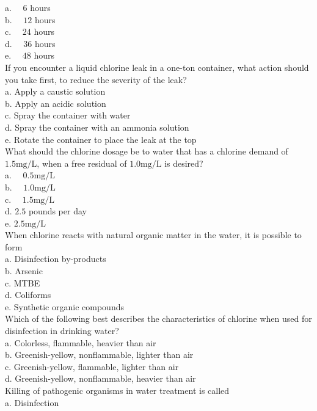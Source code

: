 a. $\quad 6$ hours\\
b. $\quad 12$ hours\\
c. $\quad 24$ hours\\
d. $\quad 36$ hours\\
e. $\quad 48$ hours\\
  If you encounter a liquid chlorine leak in a one-ton container, what action should you take first, to reduce the severity of the leak?\\
a. Apply a caustic solution\\
b. Apply an acidic solution\\
c. Spray the container with water\\
d. Spray the container with an ammonia solution\\
e. Rotate the container to place the leak at the top\\
  What should the chlorine dosage be to water that has a chlorine demand of $1.5 \mathrm{mg} / \mathrm{L}$, when a free residual of $1.0 \mathrm{mg} / \mathrm{L}$ is desired?\\
a. $\quad 0.5 \mathrm{mg} / \mathrm{L}$\\
b. $\quad 1.0 \mathrm{mg} / \mathrm{L}$\\
c. $\quad 1.5 \mathrm{mg} / \mathrm{L}$\\
d. $2.5$ pounds per day\\
e. $2.5 \mathrm{mg} / \mathrm{L}$\\
  When chlorine reacts with natural organic matter in the water, it is possible to form\\
a. Disinfection by-products \\
b. Arsenic \\
c. MTBE \\
d. Coliforms\\
e. Synthetic organic compounds\\
Which of the following best describes the characteristics of chlorine when used for disinfection in drinking water?\\
a.	 Colorless, flammable, heavier than air\\
b. Greenish-yellow, nonflammable, lighter than air\\
c. Greenish-yellow, flammable, lighter than air\\
d.  Greenish-yellow, nonflammable, heavier than air\\
  Killing of pathogenic organisms in water treatment is called\\
a. Disinfection\\
